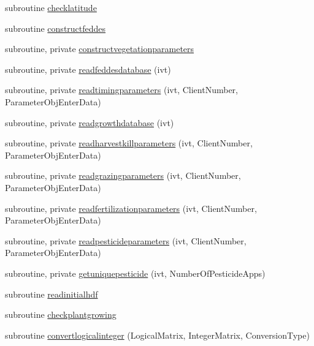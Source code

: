\begin{DoxyCompactItemize}
\item 
subroutine \mbox{\hyperlink{namespacemodulevegetation_a8c93a8f99238f47c92bfed9cc9ddedb8}{checklatitude}}
\item 
subroutine \mbox{\hyperlink{namespacemodulevegetation_a74fe469b99fa1d5d3f2ef2182dd59c7b}{constructfeddes}}
\item 
subroutine, private \mbox{\hyperlink{namespacemodulevegetation_a11da2d592ded0bd3811f9e90de324046}{constructvegetationparameters}}
\item 
subroutine, private \mbox{\hyperlink{namespacemodulevegetation_a561695c331526aacf6d2359ccf064e5b}{readfeddesdatabase}} (ivt)
\item 
subroutine, private \mbox{\hyperlink{namespacemodulevegetation_a9b539132b7ee0190f99651024f4550ee}{readtimingparameters}} (ivt, Client\+Number, Parameter\+Obj\+Enter\+Data)
\item 
subroutine, private \mbox{\hyperlink{namespacemodulevegetation_a0354ed5206e5b8c4f1269740f6b6506d}{readgrowthdatabase}} (ivt)
\item 
subroutine, private \mbox{\hyperlink{namespacemodulevegetation_aec7d28b5d51b61d5ccc514ba6a645846}{readharvestkillparameters}} (ivt, Client\+Number, Parameter\+Obj\+Enter\+Data)
\item 
subroutine, private \mbox{\hyperlink{namespacemodulevegetation_ac0d2b1971374eb7a2ded39cf56b0bd04}{readgrazingparameters}} (ivt, Client\+Number, Parameter\+Obj\+Enter\+Data)
\item 
subroutine, private \mbox{\hyperlink{namespacemodulevegetation_a5f1703a3712f12ee155098c63f043191}{readfertilizationparameters}} (ivt, Client\+Number, Parameter\+Obj\+Enter\+Data)
\item 
subroutine, private \mbox{\hyperlink{namespacemodulevegetation_abfd09d09ab90a3303dcc3a496d57223a}{readpesticideparameters}} (ivt, Client\+Number, Parameter\+Obj\+Enter\+Data)
\item 
subroutine, private \mbox{\hyperlink{namespacemodulevegetation_a57f3018a613928cdd40f99577993f439}{getuniquepesticide}} (ivt, Number\+Of\+Pesticide\+Apps)
\item 
subroutine \mbox{\hyperlink{namespacemodulevegetation_ae02d565fa46c0234360e5a9da0983414}{readinitialhdf}}
\item 
subroutine \mbox{\hyperlink{namespacemodulevegetation_a2d8935c5541507a64b862765b5c7702c}{checkplantgrowing}}
\item 
subroutine \mbox{\hyperlink{namespacemodulevegetation_af795c019d50bbacd6767423599de5ea5}{convertlogicalinteger}} (Logical\+Matrix, Integer\+Matrix, Conversion\+Type)

\end{DoxyCompactItemize}

